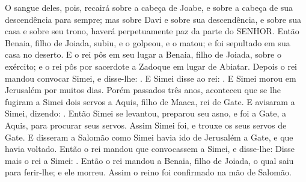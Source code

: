 {{  O sangue deles, pois, recairá sobre a cabeça de Joabe, e sobre a cabeça de sua descendência para sempre; mas sobre Davi e sobre sua descendência, e sobre sua casa e sobre seu trono, haverá perpetuamente paz da parte do SENHOR}.
  Então Benaia, filho de Joiada, subiu, e o golpeou, e o matou; e foi sepultado em sua casa no deserto.
  E o rei pôs em seu lugar a Benaia, filho de Joiada, sobre o exército; e o rei pôs por sacerdote a Zadoque em lugar de Abiatar.
  Depois o rei mandou convocar Simei, e disse-lhe: .
  E Simei disse ao rei: . E Simei morou em Jerusalém por muitos dias.
  Porém passados três anos, aconteceu que se lhe fugiram a Simei dois servos a Aquis, filho de Maaca, rei de Gate. E avisaram a Simei, dizendo: .
  Então Simei se levantou, preparou seu asno, e foi a Gate, a Aquis, para procurar seus servos. Assim Simei foi, e trouxe os seus servos de Gate.
  E disseram a Salomão como Simei havia ido de Jerusalém a Gate, e que havia voltado.
  Então o rei mandou que convocassem a Simei, e disse-lhe: 
  Disse mais o rei a Simei: .
  Então o rei mandou a Benaia, filho de Joiada, o qual saiu para ferir-lhe; e ele morreu. Assim o reino foi confirmado na mão de Salomão.
\par }

